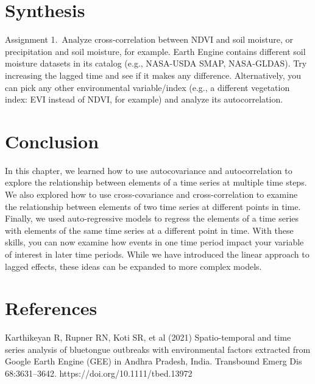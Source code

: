 \documentclass[
  letterpaper,
  DIV=11,
  numbers=noendperiod]{scrreprt}
\begin{document}
\hypertarget{synthesis-12}{%
\section*{Synthesis}\label{synthesis-12}}


Assignment 1.~Analyze cross-correlation between NDVI and soil moisture,
or precipitation and soil moisture, for example. Earth Engine contains
different soil moisture datasets in its catalog (e.g., NASA-USDA SMAP,
NASA-GLDAS). Try increasing the lagged time and see if it makes any
difference. Alternatively, you can pick any other environmental
variable/index (e.g., a different vegetation index: EVI instead of NDVI,
for example) and analyze its autocorrelation.

\hypertarget{conclusion-16}{%
\section*{Conclusion}\label{conclusion-16}}


In this chapter, we learned how to use autocovariance and
autocorrelation to explore the relationship between elements of a time
series at multiple time steps. We also explored how to use
cross-covariance and cross-correlation to examine the relationship
between elements of two time series at different points in time.
Finally, we used auto-regressive models to regress the elements of a
time series with elements of the same time series at a different point
in time. With these skills, you can now examine how events in one time
period impact your variable of interest in later time periods. While we
have introduced the linear approach to lagged effects, these ideas can
be expanded to more complex models.

\hypertarget{references-12}{%
\section*{References}\label{references-12}}


Karthikeyan R, Rupner RN, Koti SR, et al (2021) Spatio-temporal and time
series analysis of bluetongue outbreaks with environmental factors
extracted from Google Earth Engine (GEE) in Andhra Pradesh, India.
Transbound Emerg Dis 68:3631--3642. https://doi.org/10.1111/tbed.13972
\end{document}
